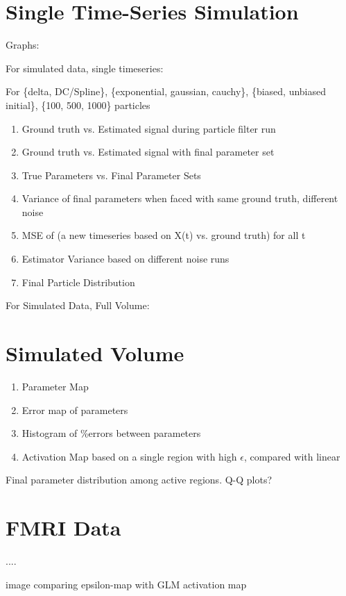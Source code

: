 \section{Single Time-Series Simulation}

Graphs: 

For simulated data, single timeseries:

For \{delta, DC/Spline\}, \{exponential, gaussian, cauchy\}, \{biased, unbiased initial\},
\{100, 500, 1000\} particles
\begin{enumerate}
\item Ground truth vs. Estimated signal during particle filter run
\item Ground truth vs. Estimated signal with final parameter set
\item True Parameters vs. Final Parameter Sets
\item Variance of final parameters when faced with same ground truth, different noise
\item MSE of (a new timeseries based on X(t) vs. ground truth) for all t
\item Estimator Variance based on different noise runs
\item Final Particle Distribution
\end{enumerate}

For Simulated Data, Full Volume:

\section{Simulated Volume}
\begin{enumerate}
\item Parameter Map 
\item Error map of parameters
\item Histogram of \%errors between parameters
\item Activation Map based on a single region with high $\epsilon$, compared with linear
\end{enumerate}

Final parameter distribution among active regions.
Q-Q plots?

\section{FMRI Data}
....

image comparing epsilon-map with GLM activation map

